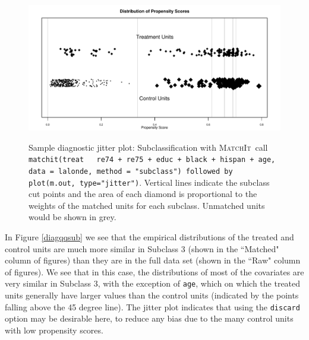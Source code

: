 \documentclass[oneside,letterpaper,titlepage]{article}
\newcommand{\MatchIt}{\textsc{MatchIt}}
\begin{document}
\begin{enumerate}
\begin{figure}[tbp]
  \begin{center}
    {\includegraphics[scale=0.5]{figs/jitterplotsub}}
    \hfill
\caption{Sample diagnostic jitter plot: Subclassification with
      \MatchIt\ call \texttt{matchit(treat ~ re74 + re75 + educ +
        black + hispan + age, data = lalonde, method = "subclass") followed by plot(m.out, type="jitter")}.
      Vertical lines indicate the subclass cut points and the area of
      each diamond is proportional to the weights of the matched units
      for each subclass.  Unmatched units would be shown in grey.}
\label{diagjittersub}
\end{center}
\end{figure}

In Figure \ref{diagqqsub} we see that the empirical distributions of
the treated and control units are much more similar in Subclass 3
(shown in the ``Matched" column of figures) than they are in the full
data set (shown in the ``Raw" column of figures).  We see that in this
case, the distributions of most of the covariates are very similar in
Subclass 3, with the exception of \texttt{age}, which on which the
treated units generally have larger values than the control units
(indicated by the points falling above the 45 degree line).  The
jitter plot indicates that using the \texttt{discard} option may be
desirable here, to reduce any bias due to the many control units with
low propensity scores.

\end{enumerate}
\end{document}
